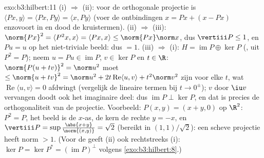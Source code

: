 \begin{solution}{exo:b3:hilbert:11}
(i) $\Rightarrow$ (ii): voor de orthogonale projectie is
$\langle Px, y\rangle = \langle Px, Py\rangle = \langle x,
Py\rangle$ (voer de ontbindingen $x = Px + (x - Px)$ enzovoort in
en dood de kruistermen). (ii) $\Rightarrow$ (iii): $\norm{Px}^2 =
\langle P^2x, x\rangle = \langle Px, x\rangle \leq \norm{Px}\norm
x$, dus $\vertiii P \leq 1$, en $Pu = u$ op het niet-triviale
beeld: dus $= 1$. (iii) $\Rightarrow$ (i): $H =
\operatorname{im}P \oplus \ker P$ (, uit $P^2 = P$);
neem $u = Pu \in \operatorname{im}P$, $v \in \ker P$ en $t \in
\R$: $\norm{P(u + tv)}^2 = \norm u^2$ moet $\leq \norm{u + tv}^2
= \norm u^2 + 2t\operatorname{Re}\langle u, v\rangle +
t^2\norm v^2$ zijn voor elke $t$, wat $\operatorname{Re}\langle
u, v\rangle = 0$ afdwingt (vergelijk de lineaire termen bij $t
\to 0^\pm$); $v$ door $\iu v$ vervangen doodt ook het imaginaire
deel: dus $\operatorname{im}P \perp \ker P$, en dat is precies de
orthogonaliteit van de projectie. Voorbeeld: $P(x, y) = (x + y,
0)$ op $\R^2$: $P^2 = P$, het beeld is de $x$-as, de kern de
rechte $y = -x$, en $\vertiii P =
\sup\frac{\abs{x+y}}{\norm{(x,y)}} = \sqrt2$ (bereikt in
$(1,1)/\sqrt2$): een scheve projectie heeft norm $> 1$. (Voor de
 geeft (ii) ook rechtstreeks (i): $\ker P = \ker P^*
= (\operatorname{im}P)^\perp$ volgens \cref{exo:b3:hilbert:8}.)
\end{solution}

